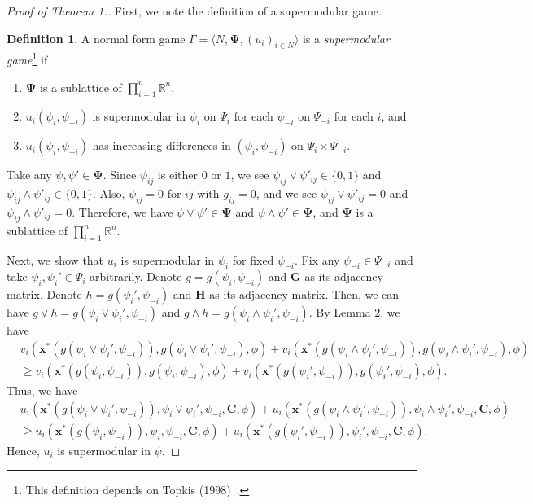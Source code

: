 \documentclass[12pt]{article}
\theoremstyle{definition}
\newtheorem{definition}{Definition}
\newcommand{\bm}[1]{\boldsymbol{#1}}
\begin{document}
\begin{proof}[Proof of Theorem 1.]
	First, we note the definition of a supermodular game.

	\begin{definition}
		A normal form game $\Gamma = \langle N, \bm{\Psi}, {(u_i)}_{i \in N} \rangle$ is a {\it{supermodular game}}\footnote{This definition depends on Topkis (1998)~\cite{topkis1998}.} if
		\begin{enumerate}
			\item $\bm{\Psi}$ is a sublattice of $\prod_{i=1}^n \mathbb{R}^n$, 
			\item $u_i(\psi_i, \psi_{-i})$ is supermodular in $\psi_i$ on $\Psi_i$ for each $\psi_{-i}$ on $\Psi_{-i}$ for each $i$, and
			\item $u_i(\psi_i, \psi_{-i})$ has increasing differences in $(\psi_i, \psi_{-i})$ on $\Psi_i \times \Psi_{-i}$.
		\end{enumerate}
	\end{definition}

	Take any $\psi, \psi' \in \bm{\Psi}$.
	Since $\psi_{ij}$ is either $0$ or $1$, we see $\psi_{ij} \vee \psi'_{ij} \in \{0, 1\}$ and $\psi_{ij} \wedge \psi'_{ij} \in \{0, 1\}$.
	Also, $\psi_{ij} = 0$ for $ij$ with $\overline{g}_{ij} = 0$, and we see $\psi_{ij} \vee \psi'_{ij} = 0$ and $\psi_{ij} \wedge \psi'_{ij} = 0$.
	Therefore, we have $\psi \vee \psi' \in \bm{\Psi}$ and $\psi \wedge \psi' \in \bm{\Psi}$, and $\bm{\Psi}$ is a sublattice of $\prod_{i=1}^n \mathbb{R}^n$.

	Next, we show that $u_i$ is supermodular in $\psi_i$ for fixed $\psi_{-i}$.
	Fix any $\psi_{-i} \in \Psi_{-i}$ and take $\psi_i, \psi_i' \in \Psi_i$ arbitrarily.
	Denote $g = g(\psi_i, \psi_{-i})$ and $\bm{G}$ as its adjacency matrix.
	Denote $h = g(\psi_i', \psi_{-i})$ and $\bm{H}$ as its adjacency matrix.
	Then, we can have $g \vee h = g(\psi_i \vee \psi_i', \psi_{-i})$ and $g \wedge h = g(\psi_i \wedge \psi_i', \psi_{-i})$.
	By Lemma 2, we have
	\begin{align*}
		& v_i(\bm{x}^*(g(\psi_i \vee \psi_i', \psi_{-i})), g(\psi_i \vee \psi_i', \psi_{-i}), \phi) + v_i(\bm{x}^*(g(\psi_i \wedge \psi_i', \psi_{-i})), g(\psi_i \wedge \psi_i', \psi_{-i}), \phi) \\
			&\ge v_i(\bm{x}^*(g(\psi_i, \psi_{-i})), g(\psi_i, \psi_{-i}), \phi) + v_i(\bm{x}^*(g(\psi_i', \psi_{-i})), g(\psi_i', \psi_{-i}), \phi).
	\end{align*}
	Thus, we have
	\begin{align*}
		& u_i(\bm{x}^*(g(\psi_i \vee \psi_i', \psi_{-i})), \psi_i \vee \psi_i', \psi_{-i}, \bm{C}, \phi) + u_i(\bm{x}^*(g(\psi_i \wedge \psi_i', \psi_{-i})), \psi_i \wedge \psi_i', \psi_{-i}, \bm{C}, \phi) \\
			& \ge u_i(\bm{x}^*(g(\psi_i, \psi_{-i})), \psi_i, \psi_{-i}, \bm{C}, \phi) + u_i(\bm{x}^*(g(\psi_i', \psi_{-i})), \psi_i', \psi_{-i}, \bm{C}, \phi) .
	\end{align*}
	Hence, $u_i$ is supermodular in $\psi$.


\end{proof}
\end{document}
